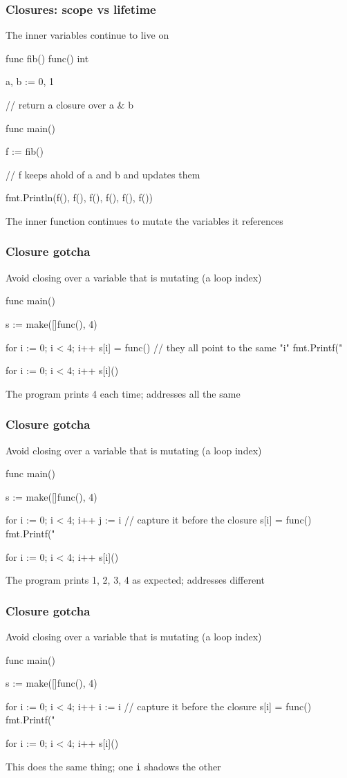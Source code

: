 \documentclass[handout,compress,t,11pt]{beamer}
\begin{document}
\begin{frame}[fragile]
    \frametitle{Closures: scope vs lifetime}
    The inner variables continue to live on \par
\begin{golang}
func fib() func() int {
	a, b := 0, 1

    // return a closure over a & b
}

func main() {
	f := fib()

    // f keeps ahold of a and b and updates them

	fmt.Println(f(), f(), f(), f(), f(), f())
}
\end{golang}
\vspace{0.4\baselineskip}
The inner function continues to mutate the variables it references
\end{frame}

\begin{frame}[fragile]
    \frametitle{Closure gotcha}
    Avoid closing over a variable that is mutating (a loop index)
\begin{golang}
func main() {
	s := make([]func(), 4)

	for i := 0; i < 4; i++ {
		s[i] = func() {
            // they all point to the same "i"
			fmt.Printf("%
		}
	}

	for i := 0; i < 4; i++ {
		s[i]()
	}
}
\end{golang}
The program prints 4 each time; addresses all the same
\end{frame}

\begin{frame}[fragile]
    \frametitle{Closure gotcha}
    Avoid closing over a variable that is mutating (a loop index)
\begin{golang}
func main() {
	s := make([]func(), 4)

	for i := 0; i < 4; i++ {
		j := i // capture it before the closure
		s[i] = func() {
			fmt.Printf("%
		}
	}

	for i := 0; i < 4; i++ {
		s[i]()
	}
}
\end{golang}
The program prints 1, 2, 3, 4 as expected; addresses different
\end{frame}

\begin{frame}[fragile]
    \frametitle{Closure gotcha}
    Avoid closing over a variable that is mutating (a loop index)
\begin{golang}
func main() {
	s := make([]func(), 4)

	for i := 0; i < 4; i++ {
		i := i // capture it before the closure
		s[i] = func() {
			fmt.Printf("%
		}
	}

	for i := 0; i < 4; i++ {
		s[i]()
	}
}
\end{golang}
This does the same thing; one \verb|i| shadows the other
\end{frame}
\end{document}
